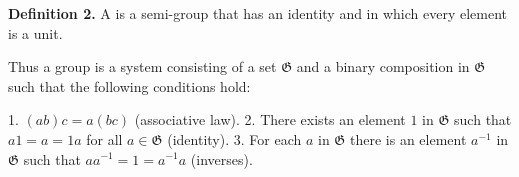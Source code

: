 \textbf{Definition 2.} A  is a semi-group that has an identity and in which every element is a unit.

Thus a group is a system consisting of a set $\mathfrak{G}$ and a binary composition in $\mathfrak{G}$ such that the following conditions hold:

1. $(ab)c = a(bc)$ (associative law).
2. There exists an element $1$ in $\mathfrak{G}$ such that $a1 = a = 1a$ for all $a \in \mathfrak{G}$ (identity).
3. For each $a$ in $\mathfrak{G}$ there is an element $a^{-1}$ in $\mathfrak{G}$ such that $aa^{-1} = 1 = a^{-1}a$ (inverses).
